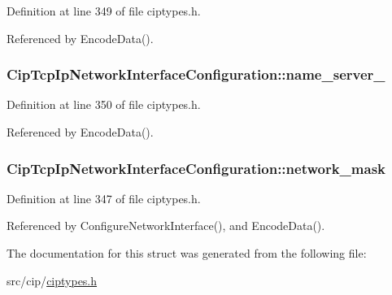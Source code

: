 \-Definition at line 349 of file ciptypes.\-h.



\-Referenced by \-Encode\-Data().

\hypertarget{structCipTcpIpNetworkInterfaceConfiguration_afa8efb882cb0a0bf9e752fe78bb1efb7}{
\subsubsection[{name\-\_\-server\-\_\-2}]{ {\bf \-Cip\-Tcp\-Ip\-Network\-Interface\-Configuration\-::name\-\_\-server\-\_}}}\label{d0/d4c/structCipTcpIpNetworkInterfaceConfiguration_afa8efb882cb0a0bf9e752fe78bb1efb7}


\-Definition at line 350 of file ciptypes.\-h.



\-Referenced by \-Encode\-Data().

\hypertarget{structCipTcpIpNetworkInterfaceConfiguration_a4bcb9a46ca3377b29cc13a80e6597a72}{
\subsubsection[{network\-\_\-mask}]{ {\bf \-Cip\-Tcp\-Ip\-Network\-Interface\-Configuration\-::network\-\_\-mask}}}\label{d0/d4c/structCipTcpIpNetworkInterfaceConfiguration_a4bcb9a46ca3377b29cc13a80e6597a72}


\-Definition at line 347 of file ciptypes.\-h.



\-Referenced by \-Configure\-Network\-Interface(), and \-Encode\-Data().



\-The documentation for this struct was generated from the following file\-:\begin{DoxyCompactItemize}
\item 
src/cip/\hyperlink{ciptypes_8h}{ciptypes.\-h}\end{DoxyCompactItemize}
